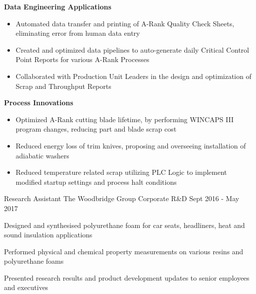 \begin{cventries}
{\begin{cvitems}
        \vspace{0.05cm}
        \item \textbf{Data Engineering Applications}
        \vspace{0.05cm}
        \begin{itemize}
            \item Automated data transfer and printing of A-Rank Quality Check Sheets, eliminating error from human data entry
            \item Created and optimized data pipelines to auto-generate daily Critical Control Point Reports for various A-Rank Processes
            \item Collaborated with Production Unit Leaders in the design and optimization of Scrap and Throughput Reports
        \end{itemize}
        \vspace{0.05cm}
        \item \textbf{Process Innovations}
        \begin{itemize}
            \item Optimized A-Rank cutting blade lifetime, by performing WINCAPS III program changes, reducing part and blade scrap cost
            \item Reduced energy loss of trim knives, proposing and overseeing installation of adiabatic washers
            \item Reduced temperature related scrap utilizing PLC Logic to implement modified startup settings and process halt conditions
        \end{itemize}
      \end{cvitems}
    }

\vspace{0.35cm}
  \cventry
    {Research Assistant} %
    {The Woodbridge Group} %
    {Corporate R\&D} %
    {Sept 2016 - May 2017} %
    {
      \begin{cvitems} %
        \item Designed and synthesised polyurethane foam for car seats, headliners, heat and sound insulation applications
        \item Performed physical and chemical property measurements on various resins and polyurethane foams  
        \item Presented research results and product development updates to senior employees and executives

\end{cvitems}}
\end{cventries}
